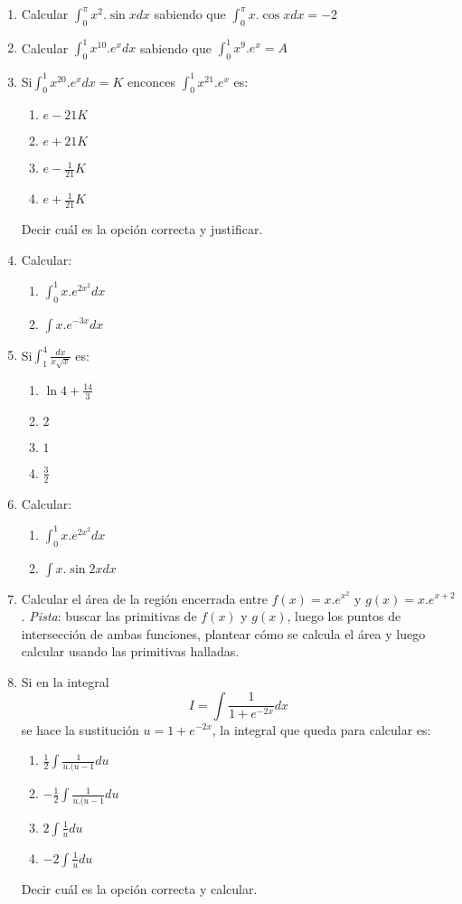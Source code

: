 \documentclass[12pt]{article}
\theoremstyle{definition}
\begin{document}
\begin{enumerate}

\item  
Calcular $\int_{0}^{\pi}x^2.\sin{x} dx$ sabiendo que $ \int_{0}^{\pi}x.\cos x dx = -2$

\item  
Calcular $\int_{0}^{1}x^{10}. e^x dx$ sabiendo que $ \int_{0}^{1}x^9. e^x  = A$

\item  
Si$ \int_{0}^{1}x^{20}. e^x dx =K$ enconces $ \int_{0}^{1}x^{21}. e^x$ es:
\begin{enumerate}
\item  $e - 21K$
\item  $e + 21K$
\item  $e - \frac{1}{21}K$
\item  $e + \frac{1}{21}K$
\end{enumerate}
Decir cuál es la opción correcta y justificar.
\item  
Calcular: 
\begin{enumerate}
\item $\int_{0}^{1}x. e^{2x^2} dx$ 
\item $\int x. e^{-3x} dx$ 
\end{enumerate}

\item  
Si$\int_{1}^{4} \frac{dx}{x\sqrt{x}}$ es:
\begin{enumerate}
\item  $\ln 4 + \frac{14}{3}$
\item  $2$
\item  $1$
\item  $\frac{3}{2}$
\end{enumerate}

\item  
Calcular: 
\begin{enumerate}
\item $\int_{0}^{1}x. e^{2x^2} dx$ 
\item $\int x. \sin{2x}dx$ 
\end{enumerate}
 
\item  
Calcular el área de la región encerrada entre $f(x) = x.e^{x^2}$ y $g(x) = x.e^{x+2}$. \textit{Pista}: buscar las primitivas de $f(x)$ y $g(x)$, luego los puntos de intersección de ambas funciones, plantear cómo se calcula el área y luego calcular usando las primitivas halladas.

\item  
Si en la integral
\begin{equation*}
I =\int \frac{1}{1+e^{-2x}}dx
\end{equation*} 
se hace la sustitución $u = 1+e^{-2x}$, la integral que queda para calcular es:
\begin{enumerate}
\item $\frac{1}{2}\int \frac{1}{u.(u-1}du$ 
\item $-\frac{1}{2}\int \frac{1}{u.(u-1}du$ 
\item $2\int \frac{1}{u}du$
\item $-2\int \frac{1}{u}du$
 \end{enumerate}
Decir cuál es la opción correcta y calcular.


\end{enumerate}
\end{document}
